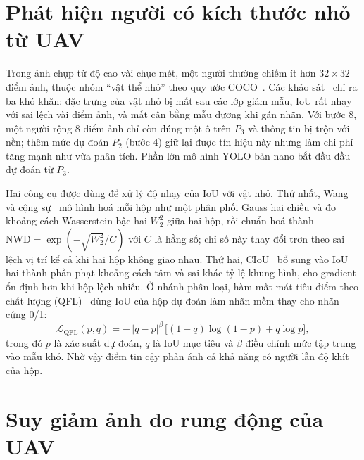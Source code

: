 \section{Phát hiện người có kích thước nhỏ từ UAV}

Trong ảnh chụp từ độ cao vài chục mét, một người thường chiếm ít hơn $32\times32$ điểm ảnh, thuộc nhóm ``vật thể nhỏ'' theo quy ước COCO~\cite{lin2014coco}. Các khảo sát~\cite{cheng2023sod,yu2020tinyperson} chỉ ra ba khó khăn: đặc trưng của vật nhỏ bị mất sau các lớp giảm mẫu, IoU rất nhạy với sai lệch vài điểm ảnh, và mất cân bằng mẫu dương khi gán nhãn. Với bước 8, một người rộng 8 điểm ảnh chỉ còn đúng một ô trên $P_3$ và thông tin bị trộn với nền; thêm mức dự đoán $P_2$ (bước 4) giữ lại được tín hiệu này nhưng làm chi phí tăng mạnh như vừa phân tích. Phần lớn mô hình YOLO bản nano bắt đầu đầu dự đoán từ $P_3$.

Hai công cụ được dùng để xử lý độ nhạy của IoU với vật nhỏ. Thứ nhất, Wang và cộng sự~\cite{wang2021nwd} mô hình hoá mỗi hộp như một phân phối Gauss hai chiều và đo khoảng cách Wasserstein bậc hai $W_2^2$ giữa hai hộp, rồi chuẩn hoá thành $\mathrm{NWD} = \exp(-\sqrt{W_2^2}/C)$ với $C$ là hằng số; chỉ số này thay đổi trơn theo sai lệch vị trí kể cả khi hai hộp không giao nhau. Thứ hai, CIoU~\cite{zheng2020diou} bổ sung vào IoU hai thành phần phạt khoảng cách tâm và sai khác tỷ lệ khung hình, cho gradient ổn định hơn khi hộp lệch nhiều. Ở nhánh phân loại, hàm mất mát tiêu điểm theo chất lượng (QFL)~\cite{li2020gfl} dùng IoU của hộp dự đoán làm nhãn mềm thay cho nhãn cứng 0/1:
\begin{equation}
\mathcal{L}_{\mathrm{QFL}}(p, q) = -\,|q - p|^{\beta}\,\big[(1-q)\log(1-p) + q \log p\big],
\label{eq:qfl}
\end{equation}
trong đó $p$ là xác suất dự đoán, $q$ là IoU mục tiêu và $\beta$ điều chỉnh mức tập trung vào mẫu khó. Nhờ vậy điểm tin cậy phản ánh cả khả năng có người lẫn độ khít của hộp.

\section{Suy giảm ảnh do rung động của UAV}
\label{sec:lythuyet_rung}

